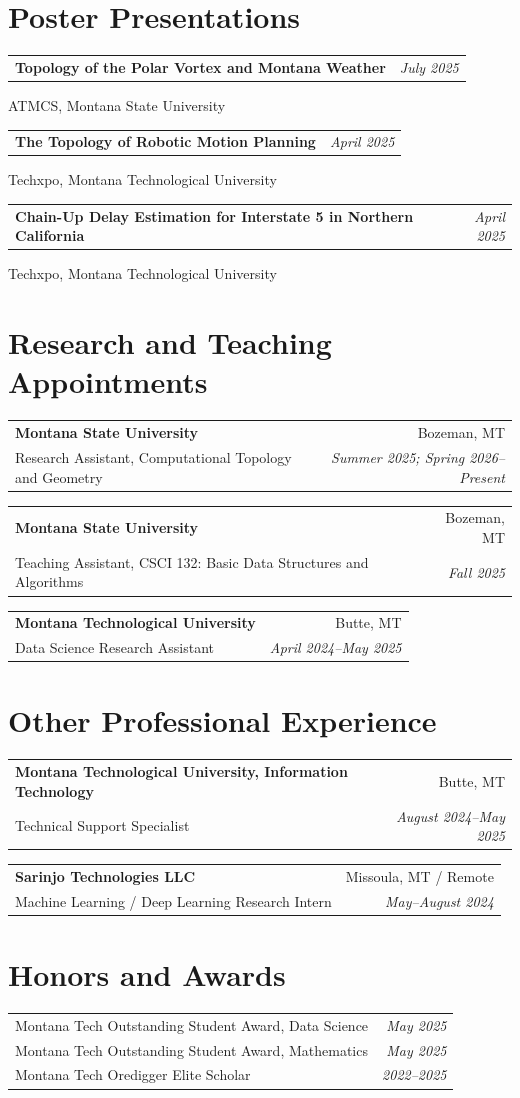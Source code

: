 \documentclass[10pt,letterpaper]{article}
\makeatletter
\newcommand{\cventry}[4]{%
  \begin{tabularx}{\textwidth}{@{}X r@{}}
    \textbf{#1} & #2 \\
    #3 & \textit{#4}
  \end{tabularx}\par\vspace{5pt}%
}
\newcommand{\presentation}[3]{%
  \begin{tabularx}{\textwidth}{@{}X r@{}}
    \textbf{#1} & \textit{#2}
  \end{tabularx}\par
  #3\par\vspace{7pt}%
}
\makeatother
\begin{document}
\section*{Poster Presentations}
\presentation{Topology of the Polar Vortex and Montana Weather}
  {July 2025}{ATMCS, Montana State University}
\presentation{The Topology of Robotic Motion Planning}
  {April 2025}{Techxpo, Montana Technological University}
\presentation{Chain-Up Delay Estimation for Interstate 5 in Northern California}
  {April 2025}{Techxpo, Montana Technological University}

\section*{Research and Teaching Appointments}
\cventry{Montana State University}{Bozeman, MT}
  {Research Assistant, Computational Topology and Geometry}
  {Summer 2025; Spring 2026--Present}
\cventry{Montana State University}{Bozeman, MT}
  {Teaching Assistant, CSCI 132: Basic Data Structures and Algorithms}{Fall 2025}
\cventry{Montana Technological University}{Butte, MT}
  {Data Science Research Assistant}{April 2024--May 2025}

\section*{Other Professional Experience}
\cventry{Montana Technological University, Information Technology}{Butte, MT}
  {Technical Support Specialist}{August 2024--May 2025}
\cventry{Sarinjo Technologies LLC}{Missoula, MT / Remote}
  {Machine Learning / Deep Learning Research Intern}{May--August 2024}

\section*{Honors and Awards}
\begin{tabularx}{\textwidth}{@{}X r@{}}
  Montana Tech Outstanding Student Award, Data Science & \textit{May 2025} \\
  Montana Tech Outstanding Student Award, Mathematics & \textit{May 2025} \\
  Montana Tech Oredigger Elite Scholar & \textit{2022--2025}
\end{tabularx}
\end{document}
